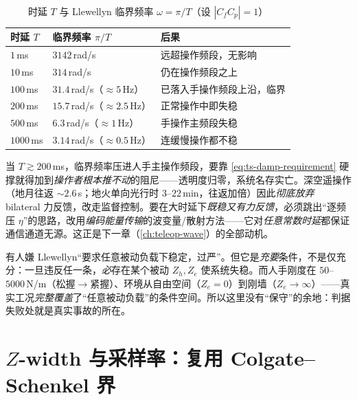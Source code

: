 \begin{table}[H]\centering\small
\caption{时延 $T$ 与 Llewellyn 临界频率 $\omega=\pi/T$（设 $|C_fC_p|=1$）}
\label{tab:ts-delay-table}
\begin{tabular}{lll}
\toprule
时延 $T$ & 临界频率 $\pi/T$ & 后果 \\
\midrule
$1\,$ms & $3142\,$rad/s & 远超操作频段，无影响 \\
$10\,$ms & $314\,$rad/s & 仍在操作频段之上 \\
$100\,$ms & $31.4\,$rad/s（$\approx5\,$Hz） & 已落入手操作频段上沿，临界 \\
$200\,$ms & $15.7\,$rad/s（$\approx2.5\,$Hz） & 正常操作中即失稳 \\
$500\,$ms & $6.3\,$rad/s（$\approx1\,$Hz） & 手操作主频段失稳 \\
$1000\,$ms & $3.14\,$rad/s（$\approx0.5\,$Hz） & 连缓慢操作都不稳 \\
\bottomrule
\end{tabular}
\end{table}

\begin{insight}
当 $T\gtrsim200\,$ms，临界频率压进人手主操作频段，要靠 \cref{eq:ts-damp-requirement} 硬撑就得加到\emph{操作者根本推不动}的阻尼——透明度归零，系统名存实亡。深空遥操作（地月往返 $\sim2.6\,$s；地火单向光行时 $3$--$22\,$min，往返加倍）因此\emph{彻底放弃} bilateral 力反馈，改走监督控制。要在大时延下\emph{既稳又有力反馈}，必须跳出“逐频压 $\eta$”的思路，改用\emph{编码能量传输}的波变量/散射方法——它对\emph{任意常数时延}都保证通信通道无源。这正是下一章（\cref{ch:teleop-wave}）的全部动机。
\end{insight}

\begin{pitfall}
有人嫌 Llewellyn“要求任意被动负载下稳定，过严”。但它是\emph{充要}条件，不是仅充分：一旦违反任一条，\emph{必}存在某个被动 $Z_h,Z_e$ 使系统失稳。而人手刚度在 $50$--$5000\,$N/m（松握$\to$紧握）、环境从自由空间（$Z_e=0$）到刚墙（$Z_e\to\infty$）——真实工况\emph{完整覆盖}了“任意被动负载”的条件空间。所以这里没有“保守”的余地：判据失败处就是真实事故的所在。
\end{pitfall}

\section{\texorpdfstring{$Z$-width}{Z-width} 与采样率：复用 Colgate--Schenkel 界}
\label{sec:ts-zwidth}

